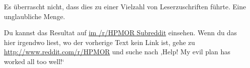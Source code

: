 {%
Es überrascht nicht, dass dies zu einer Vielzahl von Leserzuschriften führte. Eine unglaubliche Menge.

Du kannst das Resultat auf \href{http://www.reddit.com/r/HPMOR/comments/2xnyi0/113_help_my_evil_plan_has_worked_all_too_well/}{im /r/HPMOR Subreddit} einsehen.
Wenn du das hier irgendwo liest, wo der vorherige Text kein Link ist, gehe zu \url{http://www.reddit.com/r/HPMOR} und suche nach ‚Help! My evil plan has worked all too well!‘

}
